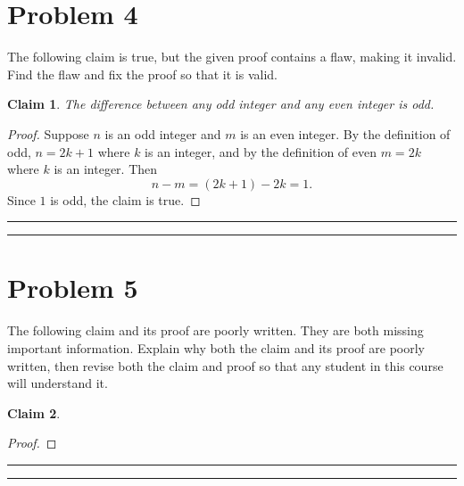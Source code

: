 \documentclass{article}
\newtheorem*{claim}{Claim} %
\theoremstyle{definition}
\newenvironment{solution}{\bigskip\hrule{\hfill}}{\bigskip\hrule{\hfill}} %
\begin{document}

\newpage


\section*{Problem 4}

The following claim is true, but the given proof contains a flaw, making it invalid. Find the flaw and fix the proof so that it is valid.

    \begin{claim}
        The difference between any odd integer and any even integer is odd.
    \end{claim}
    \begin{proof}
        Suppose $n$ is an odd integer and $m$ is an even integer. By the definition of odd, $n=2k+1$ where $k$ is an integer, and by the definition of even $m=2k$ where $k$ is an integer. Then $$n-m=\left(2k+1\right)-2k=1.$$ Since $1$ is odd, the claim is true.
    \end{proof}

\begin{solution}


\end{solution}


\newpage


\section*{Problem 5}

The following claim and its proof are poorly written. They are both missing important information. Explain why both the claim and its proof are poorly written, then revise both the claim and proof so that any student in this course will understand it.

\begin{claim}
    
\end{claim}
\begin{proof}
    
\end{proof}
\begin{solution}


\end{solution}
\end{document}
